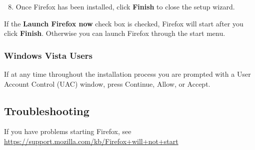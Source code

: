 \begin{enumerate}[1.]
\setcounter{enumi}{7}
\item
  Once Firefox has been installed, click \textbf{Finish} to close the
  setup wizard.
\end{enumerate}
If the \textbf{Launch Firefox now} check box is checked, Firefox will
start after you click \textbf{Finish}. Otherwise you can launch Firefox
through the start menu.

\subsubsection{Windows Vista Users}

If at any time throughout the installation process you are prompted with
a User Account Control (UAC) window, press Continue, Allow, or Accept.

\subsection{Troubleshooting}

If you have problems starting Firefox, see
\href{https://support.mozilla.com/kb/Firefox+will+not+start}{https://support.mozilla.com/kb/Firefox+will+not+start}
